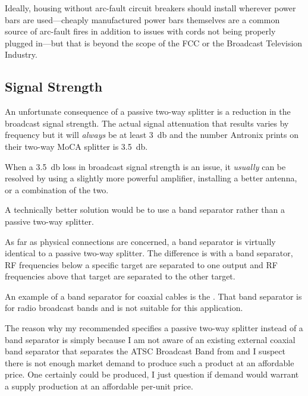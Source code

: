 Ideally, housing without arc-fault circuit breakers should install
wherever power bars are used---cheaply manufactured power bars themselves are a common source of
arc-fault fires in addition to issues with cords not being properly plugged in---but that is beyond
the scope of the FCC or the Broadcast Television Industry.

\subsection{Signal Strength}
\label{apx:moca:signalstrength}

An unfortunate consequence of a passive two-way splitter is a reduction in the broadcast signal
strength. The actual signal attenuation that results varies by frequency but it will \emph{always}
be at least \SI{3}{\decibel} and the number Antronix prints on their two-way MoCA splitter is
\SI{3.5}{\decibel}.

When a \SI{3.5}{\decibel} loss in broadcast signal strength is an issue, it \emph{usually} can
be resolved by using a slightly more powerful amplifier, installing a better antenna, or a
combination of the two.

A technically better solution would be to use a band separator rather than a passive two-way
splitter.

As far as physical connections are concerned, a band separator is virtually identical to a
passive two-way splitter. The difference is with a band separator, RF frequencies below a
specific target are separated to one output and RF frequencies above that target are separated
to the other target.

An example of a band separator for coaxial cables is the
.
That band separator is for radio broadcast bands and is not suitable for this application.

The reason why my recommended  specifies a passive two-way splitter
instead of a band separator is simply because I am not aware of an existing external coaxial
band separator that separates the ATSC Broadcast Band from \xdband{} and I suspect there
is not enough market demand to produce such a product at an affordable price. One certainly
could be produced, I just question if demand would warrant a supply production at an affordable
per-unit price.






